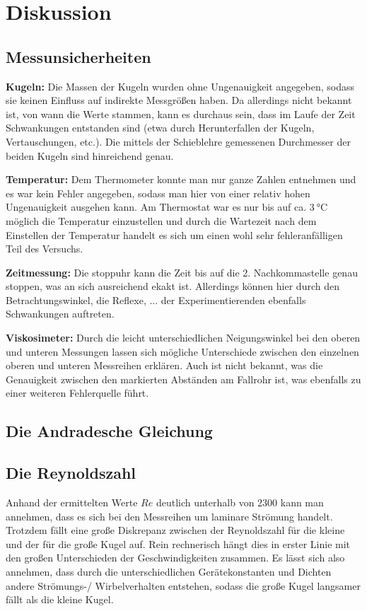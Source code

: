 \section{Diskussion}

\subsection[]{Messunsicherheiten}
\textbf{Kugeln:}
Die Massen der Kugeln wurden ohne Ungenauigkeit angegeben, sodass sie keinen Einfluss auf indirekte Messgrößen haben.
Da allerdings nicht bekannt ist, von wann die Werte stammen, kann es durchaus sein, dass im Laufe der Zeit Schwankungen entstanden sind
(etwa durch Herunterfallen der Kugeln, Vertauschungen, etc.).
Die mittels der Schieblehre gemessenen Durchmesser der beiden Kugeln sind hinreichend genau.

\textbf{Temperatur:}
Dem Thermometer konnte man nur ganze Zahlen entnehmen und es war kein Fehler angegeben, sodass man hier von einer relativ hohen Ungenauigkeit ausgehen kann.
Am Thermostat war es nur bis auf ca. $\qty{3}{\degreeCelsius}$ möglich die Temperatur einzustellen und durch die Wartezeit nach dem Einstellen der Temperatur
handelt es sich um einen wohl sehr fehleranfälligen Teil des Versuchs.

\textbf{Zeitmessung:}
Die stoppuhr kann die Zeit bis auf die 2. Nachkommastelle genau stoppen, was an sich ausreichend ekakt ist.
Allerdings können hier durch den Betrachtungswinkel, die Reflexe, ... der Experimentierenden ebenfalls Schwankungen auftreten.

\textbf{Viskosimeter:}
Durch die leicht unterschiedlichen Neigungswinkel bei den oberen und unteren Messungen lassen sich mögliche Unterschiede zwischen den einzelnen oberen und
unteren Messreihen erklären.
Auch ist nicht bekannt, was die Genauigkeit zwischen den markierten Abständen am Fallrohr ist, was ebenfalls zu einer weiteren Fehlerquelle führt.


\subsection[]{Die Andradesche Gleichung}

\subsection[]{Die Reynoldszahl}
Anhand der ermittelten Werte $Re$ deutlich unterhalb von 2300 kann man annehmen, dass es sich bei den Messreihen um laminare Strömung handelt.
Trotzdem fällt eine große Diskrepanz zwischen der Reynoldszahl für die kleine und der für die große Kugel auf.
Rein rechnerisch hängt dies in erster Linie mit den großen Unterschieden der Geschwindigkeiten zusammen.
Es lässt sich also annehmen, dass durch die unterschiedlichen Gerätekonstanten und Dichten andere Strömungs-/ Wirbelverhalten entstehen, sodass 
die große Kugel langsamer fällt als die kleine Kugel.

